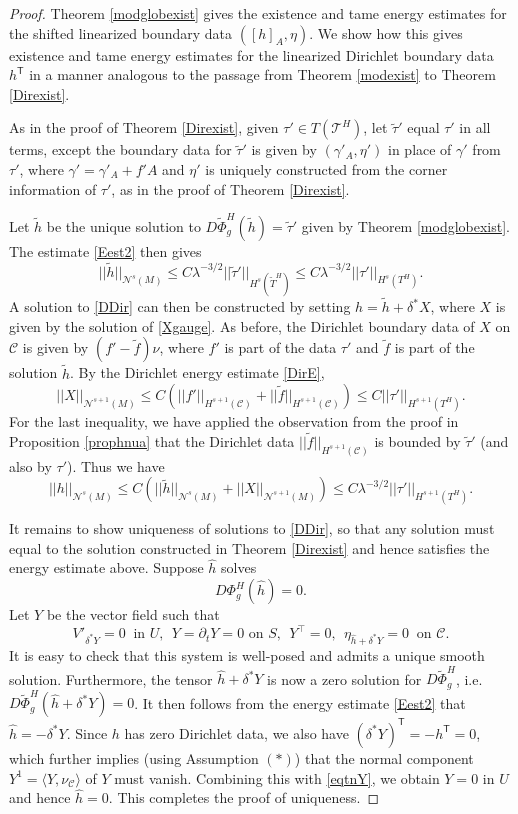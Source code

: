 \documentclass[10pt]{amsart}
\newcommand{\g}{\gamma}
\renewcommand{\d}{\delta}
\renewcommand{\l}{\lambda}
\newcommand{\cC}{{\mathcal C}}
\newcommand{\cT}{{\mathcal T}}
\newcommand{\cN}{{\mathcal N}}
\newcommand{\tT}{\mathsf{T}}
\newcommand{\be}{\begin{equation}}
\newcommand{\ee}{\end{equation}}
\newcommand{\bes}{\begin{equation*}}
\newcommand{\ees}{\end{equation*}}
\newcommand{\p}{\partial}
\renewcommand{\hat}{\widehat}
\newcommand{\<}{\langle}
\renewcommand{\>}{\rangle}
\newcommand{\w}{\widetilde}
\theoremstyle{plain}
\theoremstyle{remark}
\theoremstyle{definition}
\numberwithin{equation}{section}
\begin{document}
 \begin{proof}

    Theorem \ref{modglobexist} gives the existence and tame energy estimates for the shifted linearized boundary data $([h]_A, \eta)$.  We show 
how this gives existence and tame energy estimates for the linearized Dirichlet boundary data $h^{\tT}$ in a manner analogous to the passage from 
Theorem \ref{modexist} to Theorem \ref{Direxist}.  

 As in the proof of Theorem \ref{Direxist}, given $\tau' \in T(\cT^H)$, let $\w \tau'$ equal $\tau'$ in all terms, except the boundary data for $\w \tau'$ is 
given by $(\g'_A, \eta')$ in place of $\g'$ from $\tau'$, where $\g' = \g'_A + f'A$ and $\eta'$ is uniquely constructed from the corner information of $\tau'$, 
as in the proof of Theorem \ref{Direxist}.  
 
 Let $\w h$ be the unique solution to $D\w \Phi_g^H(\w h) = \w \tau'$ given by Theorem \ref{modglobexist}. The estimate \eqref{Eest2} then gives 
$$||\w h||_{\cN^s(M)} \leq C\l^{-3/2}||\w\tau'||_{H^{s}(\w T^H)} \leq C\l^{-3/2}||\tau'||_{H^{s}( T^H)}.$$
A solution to \eqref{DDir} can then be constructed by setting $h=\w h+\d^* X$, where $X$ is given by the solution of \eqref{Xgauge}. As before, the 
Dirichlet boundary data of $X$ on $\cC$ is given by $(f'-\w f)\nu$, where $f'$ is part of the data $\tau'$ and $\w f$ is part of the solution $\w h$. By 
the Dirichlet energy estimate \eqref{DirE}, 
\bes
||X||_{\cN^{s+1}(M)}\leq C(||f'||_{H^{s+1}(\cC)}+||\w f||_{H^{s+1}(\cC)})\leq C||\tau'||_{H^{s+1}( T^H)}.
\ees
For the last inequality, we have applied the observation from the proof in Proposition \ref{prophnua} that the Dirichlet data $||\w f||_{H^{s+1}(\cC)}$ is 
bounded by $\w\tau'$ (and also by $\tau'$). Thus we have
\bes
||h||_{\cN^s(M)} \leq C(||\w h||_{\cN^s(M)} + ||X||_{\cN^{s+1}(M)})\leq C\l^{-3/2}||\tau'||_{H^{s+1}( T^H)}.
\ees

It remains to show uniqueness of solutions to \eqref{DDir}, so that any solution must equal to the solution constructed in Theorem \ref{Direxist} and hence 
satisfies the energy estimate above. Suppose $\hat h$ solves
\bes
D\Phi^H_g(\hat h)=0.
\ees
Let $Y$ be the vector field such that 
\be\label{eqtnY}
V'_{\d^* Y}=0 \ \mbox{ in }U, \ \ Y=\p_t Y=0 \mbox{ on }S, \ \ Y^\intercal =0, \ \ \eta_{\hat h+\d^* Y}=0 \ \mbox{ on }\cC. 
\ee
It is easy to check that this system is well-posed and admits a unique smooth solution. Furthermore, the tensor $\hat h+\d^* Y$ is now a zero solution 
for $D\w\Phi_g^H$, i.e. $D\w\Phi_g^H(\hat h+\d^*Y)=0$. It then follows from the energy estimate \eqref{Eest2} that $\hat h=-\d^* Y$. Since $h$ has zero 
Dirichlet data, we also have $(\d^* Y)^{\tT} =-h^{\tT}=0$, which further implies (using Assumption $(*)$) that the normal component $Y^1=\<Y,\nu_\cC\>$ of 
$Y$ must vanish. Combining this with \eqref{eqtnY}, we obtain $Y=0$ in $U$ and hence $\hat h=0$. This completes the proof of uniqueness.

\end{proof}
 
\end{document}
